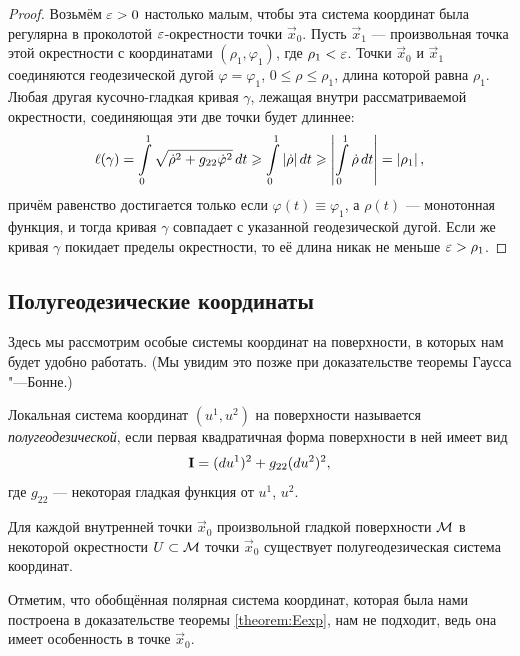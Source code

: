 \begin{proof}
	Возьмём $\varepsilon > 0$ настолько малым, чтобы эта система координат была регулярна в проколотой $\varepsilon$-окрестности точки $\vec{x}_0$. Пусть $\vec{x}_1$ --- произвольная точка этой окрестности с координатами $(\rho_1, \varphi_1)$, где $\rho_1 < \varepsilon$. Точки $\vec{x}_0$ и $\vec{x}_1$ соединяются геодезической дугой $\varphi = \varphi_1$, $0 \leqslant \rho \leqslant \rho_1$, длина которой равна $\rho_1$. Любая другая кусочно-гладкая кривая $\gamma$, лежащая внутри рассматриваемой окрестности, соединяющая эти две точки будет длиннее:
	\[
		\ell(\gamma) = \int\limits_0^1\sqrt{\dot{\rho}^2 + g_{22}\dot{\varphi}^2}\,dt \geqslant \int\limits_0^1\left\lvert\dot{\rho}\right\rvert dt \geqslant \left\lvert\int\limits_0^1\dot{\rho}\,dt\right\rvert = \left\lvert\rho_1\right\rvert,
	\]
	причём равенство достигается только если $\varphi(t) \equiv \varphi_1$, а $\rho(t)$ --- монотонная функция, и тогда кривая $\gamma$ совпадает с указанной геодезической дугой. Если же кривая $\gamma$ покидает пределы окрестности, то её длина никак не меньше $\varepsilon > \rho_1$.
\end{proof}

\subsection{Полугеодезические координаты}

Здесь мы рассмотрим особые системы координат на поверхности, в которых нам будет удобно работать. (Мы увидим это позже при доказательстве теоремы Гаусса "---Бонне.)

\begin{definition}
	Локальная система координат $(u^1, u^2)$ на поверхности называется \textit{полугеодезической}, если первая квадратичная форма поверхности в ней имеет вид
	\[
		\boldsymbol{\operatorname{I}} = (du^1)^2 + g_{22}(du^2)^2,
	\]
	где $g_{22}$ --- некоторая гладкая функция от $u^1$, $u^2$.
\end{definition}

\begin{theorem} \label{theorem:EHalfgeodesic}
	Для каждой внутренней точки $\vec{x}_0$ произвольной гладкой поверхности $\mathcal{M}$ в некоторой окрестности $U \subset \mathcal{M}$ точки $\vec{x}_0$ существует полугеодезическая система координат.
\end{theorem}

Отметим, что обобщённая полярная система координат, которая была нами построена в доказательстве теоремы \ref{theorem:Eexp}, нам не подходит, ведь она имеет особенность в точке $\vec{x}_0$.

